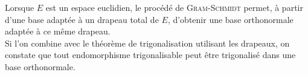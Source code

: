 Lorsque $E$ est un espace euclidien, le procédé de \textsc{Gram}-\textsc{Schmidt} permet, à partir d'une base adaptée à un drapeau total de $E$, d'obtenir une base orthonormale adaptée à ce même drapeau. \\
Si l'on combine avec le théorème de trigonalisation utilisant les drapeaux, on constate que tout endomorphisme trigonalisable peut être trigonalisé dans une base orthonormale. 

